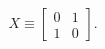 \documentclass[preview]{standalone}
\begin{document}
\begin{align*}
X \equiv \begin{bmatrix} 0 & 1 \\ 1 & 0 \end{bmatrix}.
\end{align*}
\end{document}
